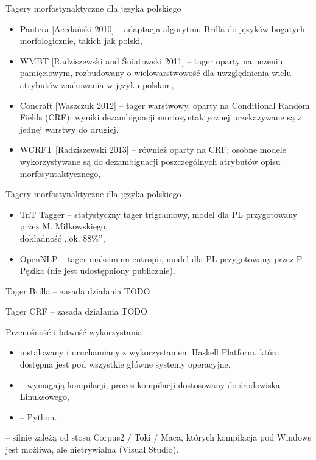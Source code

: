\documentclass{beamer}
\begin{document}
\begin{frame}{Tagery morfostynaktyczne dla języka polskiego}
\begin{itemize}
\item Pantera [Acedański 2010] -- adaptacja algorytmu Brilla do języków bogatych morfologicznie, takich jak polski,
\item WMBT [Radziszewski and Śniatowski 2011] -- tager oparty na uczeniu pamięciowym, rozbudowany o wielowarstwowość dla uwzględnienia wielu atrybutów znakowania w języku polskim,
\item Concraft [Waszczuk 2012] -- tager warstwowy, oparty na Conditional Random Fields (CRF); wyniki dezambiguacji morfosyntaktycznej przekazywane są z jednej warstwy do drugiej,
\item WCRFT [Radziszewski 2013] -- również oparty na CRF; osobne modele wykorzystywane są do dezambiguacji poszczególnych atrybutów opisu morfosyntaktycznego,
\end{itemize}
\end{frame}

\begin{frame}{Tagery morfostynaktyczne dla języka polskiego}
\begin{itemize}
\item TnT Tagger -- statystyczny tager trigramowy, model dla PL przygotowany przez M. Miłkowskiego,\\
dokładność ,,ok. 88\%'',
\item OpenNLP -- tager maksimum entropii, model dla PL przygotowany przez P. Pęzika (nie jest udostępniony publicznie).
\end{itemize}
\end{frame}

\begin{frame}{Tager Brilla -- zasada działania}
  TODO
\end{frame}

\begin{frame}{Tager CRF -- zasada działania}
  TODO
\end{frame}

\begin{frame}{Przenośność i łatwość wykorzystania}
  \begin{itemize}
    \item {} instalowany i uruchamiany z wykorzystaniem Haskell Platform, która dostępna jest pod wszystkie główne systemy operacyjne,
    \item {} -- wymagają kompilacji, proces kompilacji dostosowany do środowiska Linuksowego,
    \item {} -- Python.
  \end{itemize}
  \vspace{1cm}

   -- silnie zależą od stosu Corpus2 / Toki / Maca, których kompilacja pod Windows jest możliwa, ale nietrywialna (Visual Studio).
\end{frame}
\end{document}
